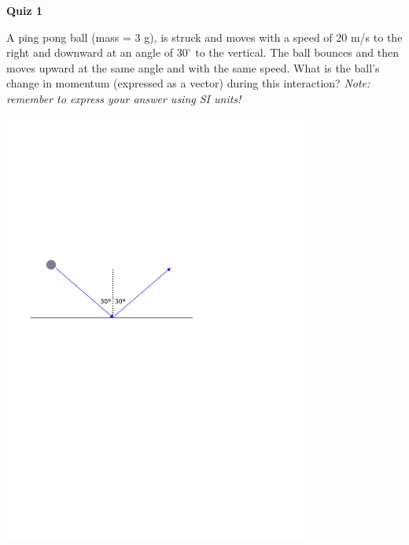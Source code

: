 \documentclass{article}
\begin{document}
\fancyfoot[C]{\thepage}
\vspace*{0cm}
\begin{center}
	{\LARGE \textbf{Quiz 1}}
\end{center}

A ping pong ball (mass = 3 g), is struck and moves with a speed of 20 m/s to the right and downward at an angle of $30^\circ$ to the vertical. The ball bounces and then moves upward at the same angle and with the same speed. What is the ball's change in momentum (expressed as a vector) during this interaction? \textit{Note: remember to express your answer using SI units!}
\begin{center}
	\includegraphics[width=10cm]{quiz1.pdf}
\end{center}
\end{document}
